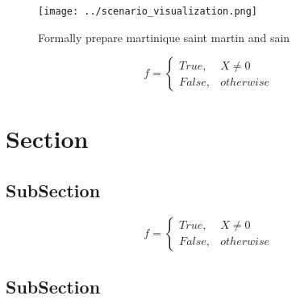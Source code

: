 \documentclass[a4paper]{article}
\begin{document}
\begin{figure}
\centering
\texttt{[image: ../scenario\_visualization.png]}
\caption{Formally prepare martinique saint martin and sain
}
\end{figure}
 
\begin{equation}   f =
\begin{cases} True, & X \neq 0\\
False, & otherwise
\end{cases}
\end{equation}

\section{Section}

\subsection{SubSection}

\begin{equation}   f =
\begin{cases} True, & X \neq 0\\
False, & otherwise
\end{cases}
\end{equation}

\subsection{SubSection}
\end{document}
